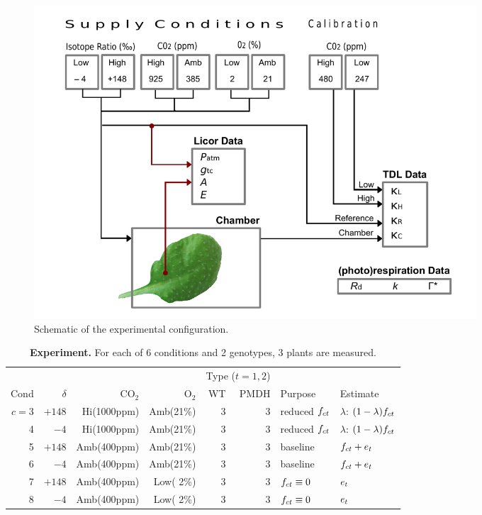 \documentclass[12pt]{article}
\begin{document}
 \begin{figure}[!hbtp]
\begin{center}
\includegraphics[width=0.8\textwidth]{Schematic_TDL-Licor2}
\caption{
  Schematic of the experimental configuration.
  }
\label{fi:tdl}
\end{center}
 \end{figure}

 \begin{table}[!hbtp]
  \begin{center}
\begin{tabular}{rrrrrrll}
\hline
     &          &             &           & \multicolumn{2}{c}{Type ($t=1,2$)} \\
Cond & $\delta$ & CO$_2$      & O$_2$     &  WT  & PMDH & Purpose     & Estimate \\
\hline
$c=3$&   $+148$ & Hi(1000ppm) & Amb(21\%) & 3    & 3 & reduced $f_{ct}$ & $\lambda$: $(1-\lambda)f_{ct}$\\
   4 &   $  -4$ & Hi(1000ppm) & Amb(21\%) & 3    & 3 & reduced $f_{ct}$ & $\lambda$: $(1-\lambda)f_{ct}$\\
   5 &   $+148$ & Amb(400ppm) & Amb(21\%) & 3    & 3 & baseline       & $f_{ct}+e_{t}$\\
   6 &   $  -4$ & Amb(400ppm) & Amb(21\%) & 3    & 3 & baseline       & $f_{ct}+e_{t}$\\
   7 &   $+148$ & Amb(400ppm) & Low( 2\%) & 3    & 3 & $f_{ct}\equiv 0$ & $e_{t}$\\
   8 &   $  -4$ & Amb(400ppm) & Low( 2\%) & 3    & 3 & $f_{ct}\equiv 0$ & $e_{t}$\\
\hline
\end{tabular}
\caption{{\bf Experiment.}  For each of 6 conditions and 2 genotypes, 3 plants are measured.}
\label{tab:design}
\end{center}
 \end{table}
\end{document}
